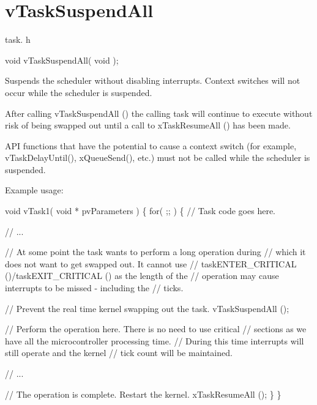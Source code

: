 \hypertarget{group__v_task_suspend_all}{}\section{v\+Task\+Suspend\+All}
\label{group__v_task_suspend_all}
task. h 
\begin{DoxyPre}void vTaskSuspendAll( void );\end{DoxyPre}


Suspends the scheduler without disabling interrupts. Context switches will not occur while the scheduler is suspended.

After calling v\+Task\+Suspend\+All () the calling task will continue to execute without risk of being swapped out until a call to x\+Task\+Resume\+All () has been made.

A\+PI functions that have the potential to cause a context switch (for example, v\+Task\+Delay\+Until(), x\+Queue\+Send(), etc.) must not be called while the scheduler is suspended.

Example usage\+: 
\begin{DoxyPre}
void vTask1( void * pvParameters )
\{
    for( ;; )
    \{
     // Task code goes here.\end{DoxyPre}



\begin{DoxyPre}     // ...\end{DoxyPre}



\begin{DoxyPre}     // At some point the task wants to perform a long operation during
     // which it does not want to get swapped out.  It cannot use
     // taskENTER\_CRITICAL ()/taskEXIT\_CRITICAL () as the length of the
     // operation may cause interrupts to be missed - including the
     // ticks.\end{DoxyPre}



\begin{DoxyPre}     // Prevent the real time kernel swapping out the task.
     vTaskSuspendAll ();\end{DoxyPre}



\begin{DoxyPre}     // Perform the operation here.  There is no need to use critical
     // sections as we have all the microcontroller processing time.
     // During this time interrupts will still operate and the kernel
     // tick count will be maintained.\end{DoxyPre}



\begin{DoxyPre}     // ...\end{DoxyPre}



\begin{DoxyPre}     // The operation is complete.  Restart the kernel.
     xTaskResumeAll ();
    \}
\}
  \end{DoxyPre}
 